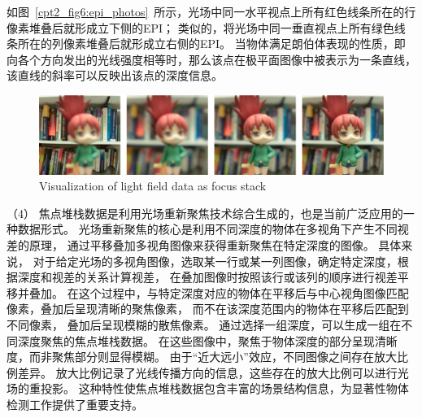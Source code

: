 如图~\ref{cpt2_fig6:epi_photos}~所示，光场中同一水平视点上所有红色线条所在的行像素堆叠后就形成立下侧的EPI；
类似的，将光场中同一垂直视点上所有绿色线条所在的列像素堆叠后就形成立右侧的EPI。
当物体满足朗伯体表现的性质，即向各个方向发出的光线强度相等时，那么该点在极平面图像中被表示为一条直线，该直线的斜率可以反映出该点的深度信息。\par
%
%
%
%
\begin{figure}[!ht]
	\centering
	\includegraphics[width=0.95\linewidth]{figures/chapter2/focal_stack}
	{Visualization of light field data as focus stack}  
	\label{cpt2_fig7:focal_stack}
\end{figure}
%
%
%
%
（4）
焦点堆栈数据是利用光场重新聚焦技术综合生成的，也是当前广泛应用的一种数据形式。
光场重新聚焦的核心是利用不同深度的物体在多视角下产生不同视差的原理，
通过平移叠加多视角图像来获得重新聚焦在特定深度的图像。
%
%
%
%
%
具体来说，
对于给定光场的多视角图像，选取某一行或某一列图像，确定特定深度，根据深度和视差的关系计算视差，
在叠加图像时按照该行或该列的顺序进行视差平移并叠加。
在这个过程中，与特定深度对应的物体在平移后与中心视角图像匹配像素，叠加后呈现清晰的聚焦像素，
而不在该深度范围内的物体在平移后匹配到不同像素，
叠加后呈现模糊的散焦像素。
通过选择一组深度，可以生成一组在不同深度聚焦的焦点堆栈数据。
%
%
%
在这些图像中，聚焦于物体深度的部分呈现清晰度，而非聚焦部分则显得模糊。
由于“近大远小”效应，不同图像之间存在放大比例差异。
放大比例记录了光线传播方向的信息，这些存在的放大比例可以进行光场的重投影。
这种特性使焦点堆栈数据包含丰富的场景结构信息，为显著性物体检测工作提供了重要支持。
\par
%
%
%
%
%
%
%
